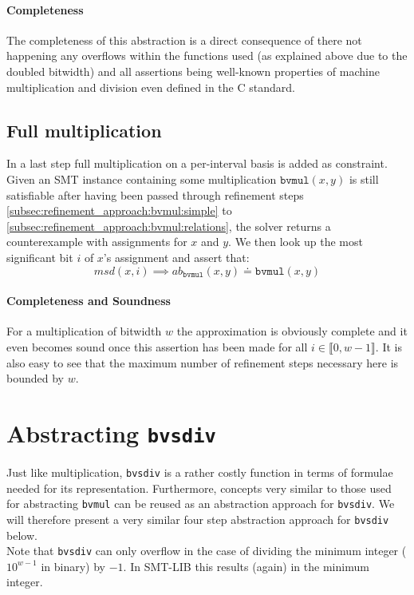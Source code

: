 \paragraph{Completeness}
The completeness of this abstraction is a direct consequence of there not happening any overflows within the functions used (as explained above due to the doubled bitwidth)
and all assertions being well-known properties of machine multiplication and division even defined in the C standard.

\subsection{Full multiplication}
\label{subsec:refinement_approach:bvmul:fullmul}
In a last step full multiplication on a per-interval basis is added as constraint.
Given an SMT instance containing some multiplication $\texttt{bvmul}\left(x,y\right)$ is still satisfiable after having been passed through refinement steps
\ref{subsec:refinement_approach:bvmul:simple} to \ref{subsec:refinement_approach:bvmul:relations}, the solver returns a counterexample with assignments for $x$ and $y$.
We then look up the most significant bit $i$ of $x$'s assignment and assert that:
\[
    msd\left(x,i\right) \implies ab_{\texttt{bvmul}}\left(x,y\right) \doteq \texttt{bvmul}\left(x,y\right)
\]
\paragraph{Completeness and Soundness}
For a multiplication of bitwidth $w$ the approximation is obviously complete and it even becomes sound once this assertion has been made
for all $i\in\llbracket 0,w-1\rrbracket$. It is also easy to see that the maximum number of refinement steps necessary here is bounded by $w$.

\section{Abstracting \texttt{bvsdiv}}
Just like multiplication, \texttt{bvsdiv} is a rather costly function in terms of formulae needed for its representation.
Furthermore, concepts very similar to those used for abstracting \texttt{bvmul} can be reused as an abstraction approach for \texttt{bvsdiv}.
We will therefore present a very similar four step abstraction approach for \texttt{bvsdiv} below.\\
Note that \texttt{bvsdiv} can only overflow in the case of dividing the minimum integer ($10^{w-1}$ in binary) by $-1$.
In SMT-LIB this results (again) in the minimum integer.

